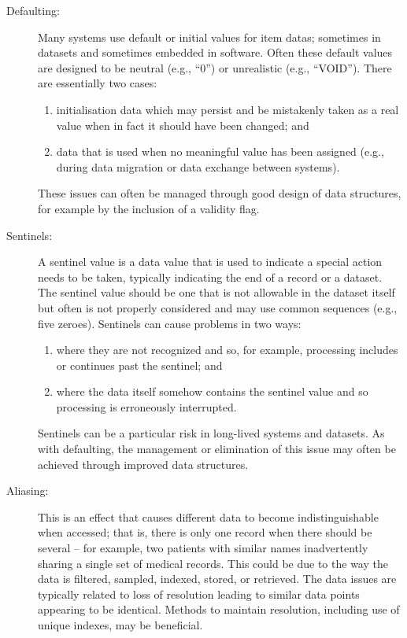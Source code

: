 \begin{description}
	\item[Defaulting:] Many systems use default or initial values for \glspl{item data}; sometimes in \glspl{dataset} and sometimes embedded in software. Often these default values are designed to be neutral (e.g., ``0'') or unrealistic (e.g., ``VOID''). There are essentially two cases:
	\begin{enumerate}
		\item initialisation data which may persist and be mistakenly taken as a real value when in fact it should have been changed; and
		\item data that is used when no meaningful value has been assigned (e.g., during data migration or data exchange between systems).
	\end{enumerate}	
	These issues can often be managed through good design of data structures, for example by the inclusion of a validity flag.
	
	\item[Sentinels:] A sentinel value is a data value that is used to indicate a special action needs to be taken, typically indicating the end of a record or a \gls{dataset}. The sentinel value should be one that is not allowable in the \gls{dataset} itself but often is not properly considered and may use common sequences (e.g., five zeroes). Sentinels can cause problems in two ways:
	\begin{enumerate}
		\item where they are not recognized and so, for example, processing includes or continues past the sentinel; and
		\item where the data itself somehow contains the sentinel value and so processing is erroneously interrupted.
	\end{enumerate}
	Sentinels can be a particular risk in long-lived systems and \glspl{dataset}. As with defaulting, the management or elimination of this issue may often be achieved through improved data structures.
	
	\item[Aliasing:] This is an effect that causes different data to become indistinguishable when accessed; that is, there is only one record when there should be several -- for example, two patients with similar names inadvertently sharing a single set of medical records. This could be due to the way the data is filtered, sampled, indexed, stored, or retrieved. The data issues are typically related to loss of resolution leading to similar data points appearing to be identical. Methods to maintain resolution, including use of unique indexes, may be beneficial.
	

\end{description}

